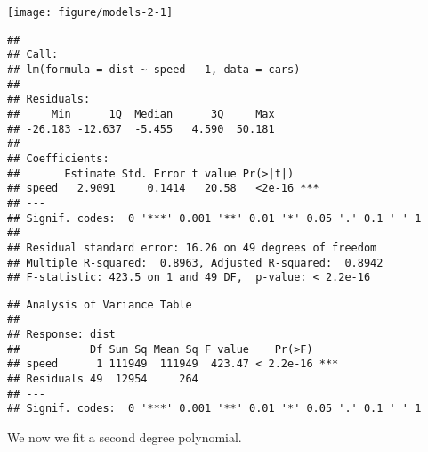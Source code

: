 \begin{knitrout}
\color{fgcolor}\begin{kframe}
\begin{alltt}
 \hlkwb{<-}  \hlopt{~}  \hlopt{-} \hlstd{,} 
  \hlstd{=} \hlstd{)}
\end{alltt}
\end{kframe}
\texttt{[image: figure/models-2-1]} 
\begin{kframe}\begin{alltt}
\end{alltt}
\begin{verbatim}
## 
## Call:
## lm(formula = dist ~ speed - 1, data = cars)
## 
## Residuals:
##     Min      1Q  Median      3Q     Max 
## -26.183 -12.637  -5.455   4.590  50.181 
## 
## Coefficients:
##       Estimate Std. Error t value Pr(>|t|)    
## speed   2.9091     0.1414   20.58   <2e-16 ***
## ---
## Signif. codes:  0 '***' 0.001 '**' 0.01 '*' 0.05 '.' 0.1 ' ' 1
## 
## Residual standard error: 16.26 on 49 degrees of freedom
## Multiple R-squared:  0.8963,	Adjusted R-squared:  0.8942 
## F-statistic: 423.5 on 1 and 49 DF,  p-value: < 2.2e-16
\end{verbatim}
\begin{alltt}
\end{alltt}
\begin{verbatim}
## Analysis of Variance Table
## 
## Response: dist
##           Df Sum Sq Mean Sq F value    Pr(>F)    
## speed      1 111949  111949  423.47 < 2.2e-16 ***
## Residuals 49  12954     264                      
## ---
## Signif. codes:  0 '***' 0.001 '**' 0.01 '*' 0.05 '.' 0.1 ' ' 1
\end{verbatim}
\end{kframe}
\end{knitrout}

We now we fit a second degree polynomial.

